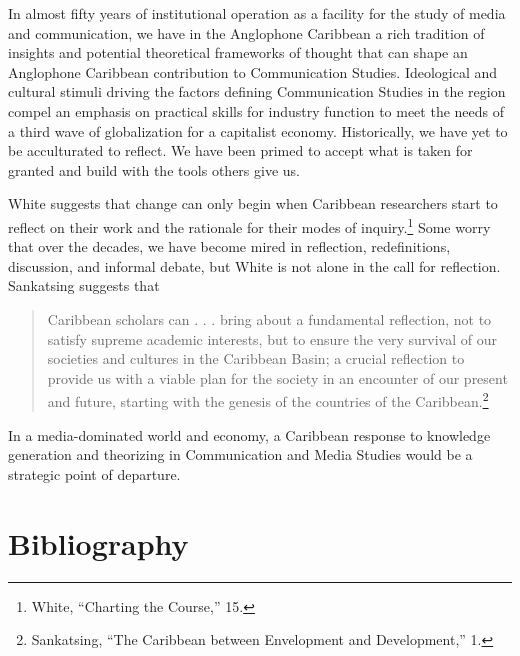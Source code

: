 \documentclass{tufte-handout}
\begin{document}
\noindent In almost fifty years of institutional operation as a facility for the
study of media and communication, we have in the Anglophone Caribbean a
rich tradition of insights and potential theoretical frameworks of
thought that can shape an Anglophone Caribbean contribution to
Communication Studies. Ideological and cultural stimuli driving the
factors defining Communication Studies in the region compel an emphasis
on practical skills for industry function to meet the needs of a third
wave of globalization for a capitalist economy. Historically, we have
yet to be acculturated to reflect. We have been primed to accept what is
taken for granted and build with the tools others give us.

White suggests that change can only begin when Caribbean researchers
start to reflect on their work and the rationale for their modes of
inquiry.\footnote{White, ``Charting the Course,'' 15.} Some worry that
over the decades, we have become mired in reflection, redefinitions,
discussion, and informal debate, but White is not alone in the call for
reflection. Sankatsing suggests that

\begin{quote}
Caribbean scholars can . . . bring about a fundamental reflection, not
to satisfy supreme academic interests, but to ensure the very survival
of our societies and cultures in the Caribbean Basin; a crucial
reflection to provide us with a viable plan for the society in an
encounter of our present and future, starting with the genesis of the
countries of the Caribbean.\footnote{Sankatsing, ``The Caribbean between
  Envelopment and Development,'' 1.}
\end{quote}

\noindent In a media-dominated world and economy, a Caribbean response to
knowledge generation and theorizing in Communication and Media Studies
would be a strategic point of departure.




\section{Bibliography}\label{bibliography}
\end{document}

